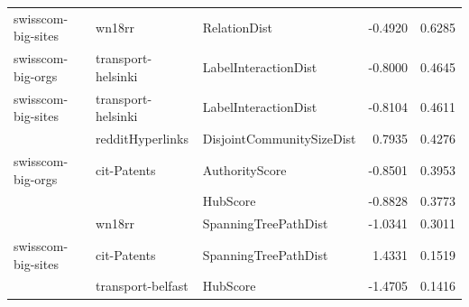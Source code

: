 \begin{table}[ht!]
\begin{adjustbox}{width=0.8\columnwidth}
\begin{tabular}{lllrr}
swisscom-big-sites & wn18rr & RelationDist & -0.4920 &       0.6285 \\
swisscom-big-orgs & transport-helsinki & LabelInteractionDist & -0.8000 &       0.4645 \\
swisscom-big-sites & transport-helsinki & LabelInteractionDist & -0.8104 &       0.4611 \\
                   & redditHyperlinks & DisjointCommunitySizeDist &  0.7935 &       0.4276 \\
swisscom-big-orgs & cit-Patents & AuthorityScore & -0.8501 &       0.3953 \\
                   &                   & HubScore & -0.8828 &       0.3773 \\
                   & wn18rr & SpanningTreePathDist & -1.0341 &       0.3011 \\
swisscom-big-sites & cit-Patents & SpanningTreePathDist &  1.4331 &       0.1519 \\
                   & transport-belfast & HubScore & -1.4705 &       0.1416 \\
\bottomrule
\end{tabular}
\end{adjustbox}
\end{table}

